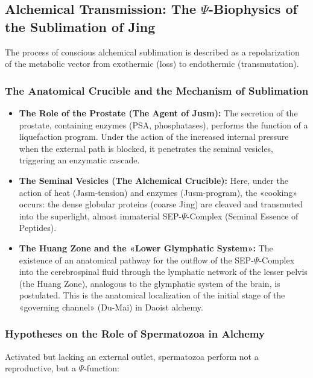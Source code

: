 \documentclass[a4paper,12pt]{article}
\begin{document}
	\subsection{Alchemical Transmission: The $\Psi$-Biophysics of the Sublimation of Jing}
	
	The process of conscious alchemical sublimation is described as a repolarization of the metabolic vector from exothermic (loss) to endothermic (transmutation).
	
	\subsubsection{The Anatomical Crucible and the Mechanism of Sublimation}
	
	\begin{itemize}
		\item \textbf{The Role of the Prostate (The Agent of Jusm):} The secretion of the prostate, containing enzymes (PSA, phosphatases), performs the function of a liquefaction program. Under the action of the increased internal pressure when the external path is blocked, it penetrates the seminal vesicles, triggering an enzymatic cascade.
		
		\item \textbf{The Seminal Vesicles (The Alchemical Crucible):} Here, under the action of heat (Jasm-tension) and enzymes (Jusm-program), the «cooking» occurs: the dense globular proteins (coarse Jing) are cleaved and transmuted into the superlight, almost immaterial SEP-$\Psi$-Complex (Seminal Essence of Peptides).
		
		\item \textbf{The Huang Zone and the «Lower Glymphatic System»:} The existence of an anatomical pathway for the outflow of the SEP-$\Psi$-Complex into the cerebrospinal fluid through the lymphatic network of the lesser pelvis (the Huang Zone), analogous to the glymphatic system of the brain, is postulated. This is the anatomical localization of the initial stage of the «governing channel» (Du-Mai) in Daoist alchemy.
	\end{itemize}
	
	\subsubsection{Hypotheses on the Role of Spermatozoa in Alchemy}
	
	Activated but lacking an external outlet, spermatozoa perform not a reproductive, but a $\Psi$-function:
	
\end{document}
